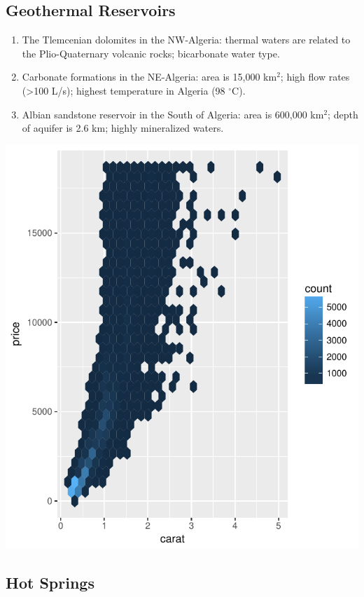 \documentclass[a0, portrait]{a0poster}
\begin{document}
\begin{multicols}{3}
\subsection*{Geothermal Reservoirs}
\begin{enumerate}
\item The Tlemcenian dolomites in the NW-Algeria: thermal waters are related to the Plio-Quaternary volcanic rocks; bicarbonate water type.
\item Carbonate formations in the NE-Algeria: area is 15,000 km$^2$; high flow rates (\textgreater100 L/s); highest temperature in Algeria (98 $^{\circ}$C).
\item Albian sandstone reservoir in the South of Algeria: area is 600,000 km$^2$; depth of aquifer is 2.6 km; highly mineralized waters.
\end{enumerate}
\begin{center}\vspace{1cm}
\includegraphics[width=0.8\linewidth]{diamonds.pdf}
\end{center}\vspace{1cm}

\subsection*{Hot Springs}
\begin{center}\vspace{1cm}
\end{center}\vspace{1cm}


\end{multicols}
\end{document}
